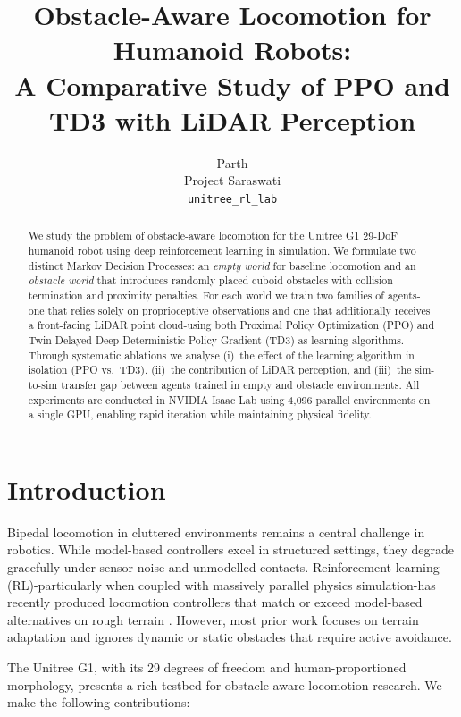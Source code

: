 \documentclass{article}
\title{Obstacle-Aware Locomotion for Humanoid Robots:\\
       A Comparative Study of PPO and TD3 with LiDAR Perception}
\author{
  Parth \\
  Project Saraswati \\
  \texttt{unitree\_rl\_lab}
}
\begin{document}
\maketitle

\begin{abstract}
We study the problem of obstacle-aware locomotion for the Unitree G1 29-DoF
humanoid robot using deep reinforcement learning in simulation.
We formulate two distinct Markov Decision Processes: an \emph{empty world} for
baseline locomotion and an \emph{obstacle world} that introduces randomly
placed cuboid obstacles with collision termination and proximity penalties.
For each world we train two families of agents-one that relies solely on
proprioceptive observations and one that additionally receives a front-facing
LiDAR point cloud-using both Proximal Policy Optimization (PPO) and Twin
Delayed Deep Deterministic Policy Gradient (TD3) as learning algorithms.
Through systematic ablations we analyse (i)~the effect of the learning
algorithm in isolation (PPO vs.\ TD3), (ii)~the contribution of LiDAR
perception, and (iii)~the sim-to-sim transfer gap between agents trained in
empty and obstacle environments.
All experiments are conducted in NVIDIA Isaac Lab using 4{,}096 parallel
environments on a single GPU, enabling rapid iteration while maintaining
physical fidelity.
\end{abstract}

\section{Introduction}

Bipedal locomotion in cluttered environments remains a central challenge in
robotics.
While model-based controllers excel in structured settings, they degrade
gracefully under sensor noise and unmodelled contacts.
Reinforcement learning (RL)-particularly when coupled with massively parallel
physics simulation-has recently produced locomotion controllers that match or
exceed model-based alternatives on rough terrain
\cite{lee2020learning,kumar2021rma,margolis2022rapid}.
However, most prior work focuses on terrain adaptation and ignores dynamic or
static obstacles that require active avoidance.

The Unitree G1, with its 29 degrees of freedom and human-proportioned
morphology, presents a rich testbed for obstacle-aware locomotion research.
We make the following contributions:
\end{document}
